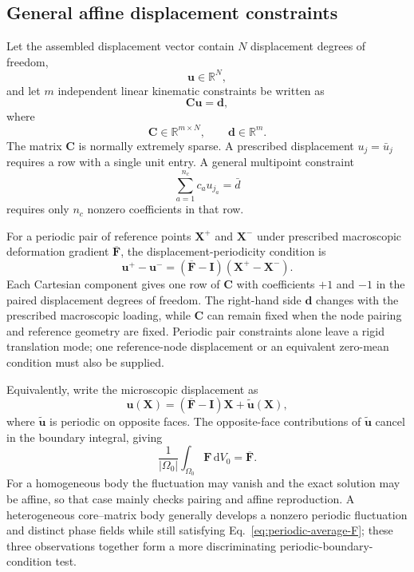 \documentclass[11pt,a4paper]{article}
\newcommand{\bs}[1]{\boldsymbol{#1}}
\newcommand{\I}{\bs{I}}
\newcommand{\F}{\bs{F}}
\newcommand{\vct}[1]{\mathbf{#1}}
\begin{document}
\subsection{General affine displacement constraints}

Let the assembled displacement vector contain $N$ displacement degrees of freedom,
\begin{equation}
\vct{u}\in\mathbb{R}^{N},
\end{equation}
and let $m$ independent linear kinematic constraints be written as
\begin{equation}
\boxed{
\vct{C}\vct{u}=\vct{d},
}
\label{eq:Cu-d}
\end{equation}
where
\begin{equation}
\vct{C}\in\mathbb{R}^{m\times N},
\qquad
\vct{d}\in\mathbb{R}^{m}.
\end{equation}
The matrix $\vct C$ is normally extremely sparse. A prescribed displacement $u_j=\bar u_j$ requires a row with a single unit entry. A general multipoint constraint
\begin{equation}
\sum_{a=1}^{n_c}c_a u_{j_a}=\bar d
\end{equation}
requires only $n_c$ nonzero coefficients in that row.

For a periodic pair of reference points $\bs X^+$ and $\bs X^-$ under prescribed macroscopic deformation gradient $\overline{\F}$, the displacement-periodicity condition is
\begin{equation}
\boxed{
\bs u^+-\bs u^-
=
(\overline{\F}-\I)(\bs X^+-\bs X^-).
}
\label{eq:periodic-pair}
\end{equation}
Each Cartesian component gives one row of $\vct C$ with coefficients $+1$ and $-1$ in the paired displacement degrees of freedom. The right-hand side $\vct d$ changes with the prescribed macroscopic loading, while $\vct C$ can remain fixed when the node pairing and reference geometry are fixed. Periodic pair constraints alone leave a rigid translation mode; one reference-node displacement or an equivalent zero-mean condition must also be supplied.

Equivalently, write the microscopic displacement as
\begin{equation}
\bs u(\bs X)=(\overline{\F}-\I)\bs X+\widetilde{\bs u}(\bs X),
\end{equation}
where $\widetilde{\bs u}$ is periodic on opposite faces. The opposite-face contributions of $\widetilde{\bs u}$ cancel in the boundary integral, giving
\begin{equation}
\boxed{
\frac{1}{|\Omega_0|}\int_{\Omega_0}\F\,\mathrm dV_0=\overline{\F}.
}
\label{eq:periodic-average-F}
\end{equation}
For a homogeneous body the fluctuation may vanish and the exact solution may be affine, so that case mainly checks pairing and affine reproduction. A heterogeneous core--matrix body generally develops a nonzero periodic fluctuation and distinct phase fields while still satisfying Eq.~\eqref{eq:periodic-average-F}; these three observations together form a more discriminating periodic-boundary-condition test.
\end{document}
